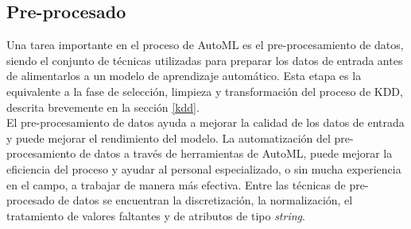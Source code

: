 \subsection{Pre-procesado} \label{epig:preprocesado}
Una tarea importante en el proceso de AutoML es el pre-procesamiento de datos, siendo el conjunto de técnicas utilizadas para preparar los datos de entrada antes de alimentarlos a un modelo de aprendizaje automático. Esta etapa es la equivalente a la fase de selección, limpieza y transformación del proceso de KDD, descrita brevemente en la sección \ref{kdd}. \\
El pre-procesamiento de datos ayuda a mejorar la calidad de los datos de entrada y puede mejorar el rendimiento del modelo. La automatización del pre-procesamiento de datos a través de herramientas de AutoML, puede mejorar la eficiencia del proceso y ayudar al personal especializado, o sin mucha experiencia en el campo, a trabajar de manera más efectiva. Entre las técnicas de pre-procesado de datos se encuentran la discretización, la normalización, el tratamiento de valores faltantes y de atributos de tipo \textit{string}.

